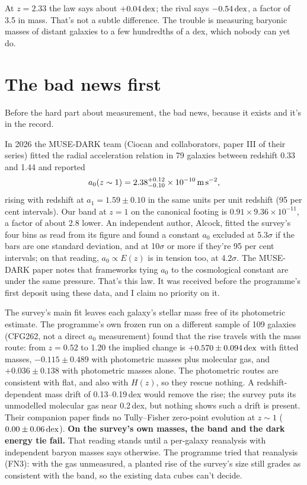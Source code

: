 At $z=2.33$ the law says about $+0.04\,\mathrm{dex}$; the rival says $-0.54\,\mathrm{dex}$, a factor of 3.5 in mass. That's not a subtle difference. The trouble is measuring baryonic masses of distant galaxies to a few hundredths of a dex, which nobody can yet do.

\section{The bad news first}

Before the hard part about measurement, the bad news, because it exists and it's in the record.

In 2026 the MUSE-DARK team (Ciocan and collaborators, paper III of their series) fitted the radial acceleration relation in 79 galaxies between redshift 0.33 and 1.44 and reported
\[
a_0(z\sim1)=2.38^{+0.12}_{-0.10}\times10^{-10}\,\mathrm{m\,s^{-2}},
\]
rising with redshift at $a_1=1.59\pm0.10$ in the same units per unit redshift (95 per cent intervals). Our band at $z=1$ on the canonical footing is $0.91\times9.36\times10^{-11}$, a factor of about 2.8 lower. An independent author, Alcock, fitted the survey's four bins as read from its figure and found a constant $a_0$ excluded at 5.3$\sigma$ if the bars are one standard deviation, and at 10$\sigma$ or more if they're 95 per cent intervals; on that reading, $a_0\propto E(z)$ is in tension too, at 4.2$\sigma$. The MUSE-DARK paper notes that frameworks tying $a_0$ to the cosmological constant are under the same pressure. That's this law. It was received before the programme's first deposit using these data, and I claim no priority on it.

\begin{honestbox}
The survey's main fit leaves each galaxy's stellar mass free of its photometric estimate. The programme's own frozen run on a different sample of 109 galaxies (CFG262, not a direct $a_0$ measurement) found that the rise travels with the mass route: from $z=0.52$ to 1.20 the implied change is $+0.570\pm0.094\,\mathrm{dex}$ with fitted masses, $-0.115\pm0.489$ with photometric masses plus molecular gas, and $+0.036\pm0.138$ with photometric masses alone. The photometric routes are consistent with flat, and also with $H(z)$, so they rescue nothing. A redshift-dependent mass drift of 0.13--0.19\,dex would remove the rise; the survey puts its unmodelled molecular gas near 0.2\,dex, but nothing shows such a drift is present. Their companion paper finds no Tully--Fisher zero-point evolution at $z\sim1$ ($0.00\pm0.06\,\mathrm{dex}$). \textbf{On the survey's own masses, the band and the dark energy tie fail.} That reading stands until a per-galaxy reanalysis with independent baryon masses says otherwise. The programme tried that reanalysis (FN3): with the gas unmeasured, a planted rise of the survey's size still grades as consistent with the band, so the existing data cubes can't decide.
\end{honestbox}

